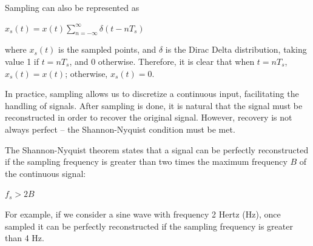 \documentclass{article}
\begin{document}
Sampling can also be represented as 
\begin{center}
    \begin{math}
        x_s(t) = x(t) \displaystyle\sum_{n=-\infty}^{\infty} \delta (t-nT_s)
    \end{math}  
\end{center}
where $x_s(t)$ is the sampled points, and $\delta$ is the Dirac Delta distribution, taking value 1 if $t=nT_s$, and 0 otherwise.
Therefore, it is clear that when $t=nT_s$, $x_s(t) = x(t)$; otherwise, $x_s(t) = 0$. 

In practice, sampling allows us to discretize a continuous input, facilitating the handling of signals. 
After sampling is done, it is natural that the signal must be reconstructed in order to recover the original signal.
However, recovery is not always perfect -- the Shannon-Nyquist condition must be met.

The Shannon-Nyquist theorem states that a signal can be perfectly reconstructed if the sampling frequency is greater than two times the maximum frequency $B$ of the continuous signal:
\begin{center}
    \begin{math}
        f_s > 2B
    \end{math}  
\end{center}
For example, if we consider a sine wave with frequency 2 Hertz (Hz), once sampled it can be perfectly reconstructed if the sampling frequency is greater than 4 Hz.
\end{document}
